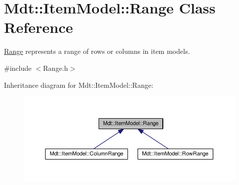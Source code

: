 \hypertarget{class_mdt_1_1_item_model_1_1_range}{}\section{Mdt\+:\+:Item\+Model\+:\+:Range Class Reference}
\label{class_mdt_1_1_item_model_1_1_range}


\hyperlink{class_mdt_1_1_item_model_1_1_range}{Range} represents a range of rows or columns in item models.  




{\ttfamily \#include $<$Range.\+h$>$}



Inheritance diagram for Mdt\+:\+:Item\+Model\+:\+:Range\+:
\nopagebreak
\begin{figure}[H]
\begin{center}
\leavevmode
\includegraphics[width=350pt]{class_mdt_1_1_item_model_1_1_range__inherit__graph}
\end{center}
\end{figure}
